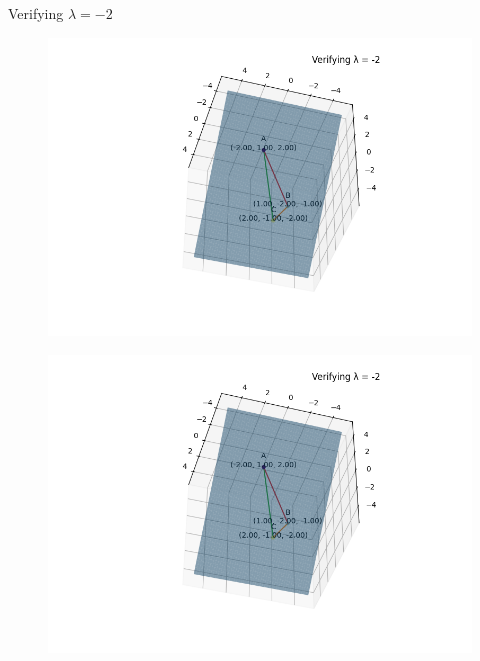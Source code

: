 \documentclass[journal]{IEEEtran}
\begin{document}
Verifying $\lambda = -2$
    \begin{figure}[h]
        \centering
       \includegraphics[width=0.7\linewidth]{figs/fig1.png}
       \caption{}
       \label{graph}
    \end{figure}
    \begin{figure}[h]
        \centering
       \includegraphics[width=0.7\linewidth]{figs/fig1.png}
       \caption{}
       \label{graph}
    \end{figure}
\end{document}
